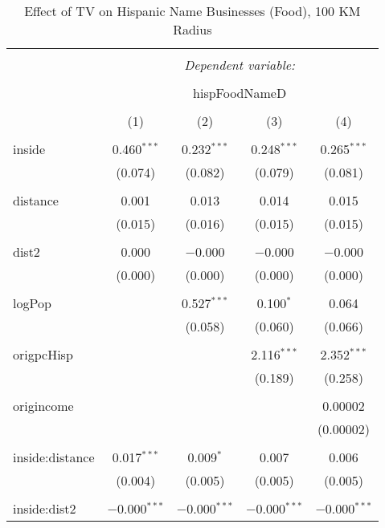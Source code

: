 
\begin{table}[!htbp] \centering 
  \caption{Effect of TV on Hispanic Name Businesses (Food), 100 KM Radius} 
  \label{} 
\begin{tabular}{@{\extracolsep{-5pt}}lcccc} 
\\[-1.8ex]\hline 
\hline \\[-1.8ex] 
 & \multicolumn{4}{c}{\textit{Dependent variable:}} \\ 
\cline{2-5} 
\\[-1.8ex] & \multicolumn{4}{c}{hispFoodNameD} \\ 
\\[-1.8ex] & (1) & (2) & (3) & (4)\\ 
\hline \\[-1.8ex] 
 inside & 0.460$^{***}$ & 0.232$^{***}$ & 0.248$^{***}$ & 0.265$^{***}$ \\ 
  & (0.074) & (0.082) & (0.079) & (0.081) \\ 
  & & & & \\ 
 distance & 0.001 & 0.013 & 0.014 & 0.015 \\ 
  & (0.015) & (0.016) & (0.015) & (0.015) \\ 
  & & & & \\ 
 dist2 & 0.000 & $-$0.000 & $-$0.000 & $-$0.000 \\ 
  & (0.000) & (0.000) & (0.000) & (0.000) \\ 
  & & & & \\ 
 logPop &  & 0.527$^{***}$ & 0.100$^{*}$ & 0.064 \\ 
  &  & (0.058) & (0.060) & (0.066) \\ 
  & & & & \\ 
 origpcHisp &  &  & 2.116$^{***}$ & 2.352$^{***}$ \\ 
  &  &  & (0.189) & (0.258) \\ 
  & & & & \\ 
 origincome &  &  &  & 0.00002 \\ 
  &  &  &  & (0.00002) \\ 
  & & & & \\ 
 inside:distance & 0.017$^{***}$ & 0.009$^{*}$ & 0.007 & 0.006 \\ 
  & (0.004) & (0.005) & (0.005) & (0.005) \\ 
  & & & & \\ 
 inside:dist2 & $-$0.000$^{***}$ & $-$0.000$^{***}$ & $-$0.000$^{***}$ & $-$0.000$^{***}$ \\ 

\end{tabular}
\end{table}
